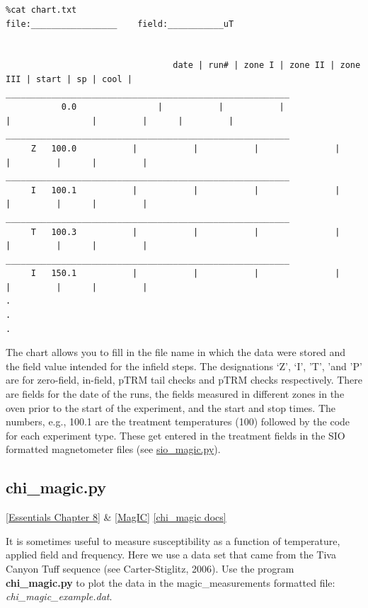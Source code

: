 \documentclass[11pt]{book}
\begin{document}
{{{\begin{verbatim}
%cat chart.txt
file:_________________    field:___________uT


                                 date | run# | zone I | zone II | zone III | start | sp | cool |
________________________________________________________
		   0.0	              |           |           |               |                |         |      |         |
________________________________________________________
	 Z 	 100.0           |           |           |               |                |         |      |         |
________________________________________________________
	 I 	 100.1           |           |           |               |                |         |      |         |
________________________________________________________
	 T 	 100.3           |           |           |               |                |         |      |         |
________________________________________________________
	 I 	 150.1           |           |           |               |                |         |      |         |
.
.
.

\end{verbatim}

The chart allows you to fill in the file name in which the data were stored and the field value intended for the 
infield steps.  The designations `Z', `I', 'T', 'and 'P'  are for zero-field, in-field, pTRM tail checks and pTRM checks respectively.  There are fields for the date of the runs, the fields measured in different zones in the oven prior to the start of the experiment, and the start and stop times.  The numbers, e.g., 100.1 are the treatment temperatures (100) followed by the code for each experiment type.  These get entered in the treatment fields in the SIO formatted magnetometer files (see \href{#SIO_magic}{sio\_magic.py}).

\subsection{chi\_magic.py} 
\href{http://magician.ucsd.edu/Essentials_2/WebBook2ch8.html#ch8}{[Essentials Chapter 8]} \& \href{#MagIC}{[MagIC]}\label{ex:chi_magic}
\href{http://earthref.org/PmagPy/pmagpydocs/chi_magic-module.html}{[chi\_magic docs]}

It is sometimes useful to measure susceptibility as a function of temperature, applied field and frequency.   Here we use a data set that came from the Tiva Canyon Tuff sequence (see Carter-Stiglitz,  2006).  \nocite{carterstiglitz06}    Use the program {\bf chi\_magic.py} to plot the data in the magic\_measurements formatted file: {\it chi\_magic\_example.dat}.   

}}}
\end{document}
